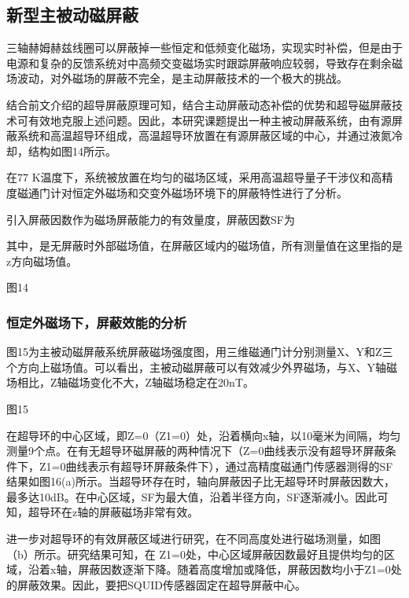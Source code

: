 \documentclass[a4paper,12pt，twoside]{ctexart}
\begin{document}
	
	\subsection{新型主被动磁屏蔽}
	三轴赫姆赫兹线圈可以屏蔽掉一些恒定和低频变化磁场，实现实时补偿，但是由于电源和复杂的反馈系统对中高频交变磁场实时跟踪屏蔽响应较弱，导致存在剩余磁场波动，对外磁场的屏蔽不完全，是主动屏蔽技术的一个极大的挑战。\par
	结合前文介绍的超导屏蔽原理可知，结合主动屏蔽动态补偿的优势和超导磁屏蔽技术可有效地克服上述问题。因此，本研究课题提出一种主被动屏蔽系统，由有源屏蔽系统和高温超导环组成，高温超导环放置在有源屏蔽区域的中心，并通过液氮冷却，结构如图14所示。\par
	在77 K温度下，系统被放置在均匀的磁场区域，采用高温超导量子干涉仪和高精度磁通门计对恒定外磁场和交变外磁场环境下的屏蔽特性进行了分析。\par
	引入屏蔽因数作为磁场屏蔽能力的有效量度，屏蔽因数SF为\par 
	其中，是无屏蔽时外部磁场值，在屏蔽区域内的磁场值，所有测量值在这里指的是z方向磁场值。\par 
	
	图14\par 
	 
	 \subsubsection{恒定外磁场下，屏蔽效能的分析}
	 图15为主被动磁屏蔽系统屏蔽磁场强度图，用三维磁通门计分别测量X、Y和Z三个方向上磁场值。可以看出，主被动磁屏蔽可以有效减少外界磁场，与X、Y轴磁场相比，Z轴磁场变化不大，Z轴磁场稳定在20nT。\par 
	 图15\par
	
	在超导环的中心区域，即Z=0（Z1=0）处，沿着横向x轴，以10毫米为间隔，均匀测量9个点。在有无超导环磁屏蔽的两种情况下（Z=0曲线表示没有超导环屏蔽条件下，Z1=0曲线表示有超导环屏蔽条件下），通过高精度磁通门传感器测得的SF结果如图16(a)所示。当超导环存在时，轴向屏蔽因子比无超导环时屏蔽因数大，最多达10dB。在中心区域，SF为最大值，沿着半径方向，SF逐渐减小。因此可知，超导环在z轴的屏蔽磁场非常有效。\par
	进一步对超导环的有效屏蔽区域进行研究，在不同高度处进行磁场测量，如图（b）所示。研究结果可知，在 Z1=0处，中心区域屏蔽因数最好且提供均匀的区域，沿着x轴，屏蔽因数逐渐下降。随着高度增加或降低，屏蔽因数均小于Z1=0处的屏蔽效果。因此，要把SQUID传感器固定在超导屏蔽中心。\par
	
\end{document}
